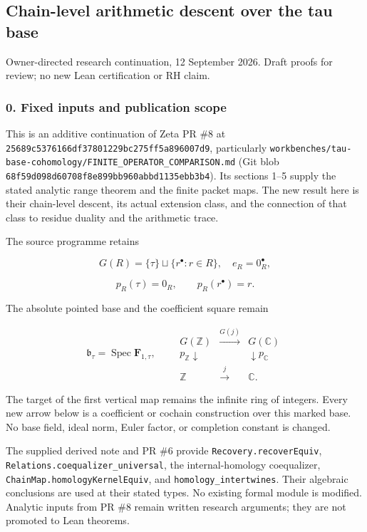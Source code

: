 \subsection{Chain-level arithmetic descent over the tau
base}\label{pr_9:chain-level-arithmetic-descent-over-the-tau-base}

Owner-directed research continuation, 12 September 2026. Draft proofs for review; no new Lean
certification or RH claim.

\subsubsection{0. Fixed inputs and publication scope}\label{pr_9:fixed-inputs-and-publication-scope}

This is an additive continuation of Zeta PR \#8 at
\nolinkurl{25689c5376166df37801229bc275ff5a896007d9}, particularly
\nolinkurl{workbenches/tau-base-cohomology/FINITE_OPERATOR_COMPARISON.md} (Git blob
\nolinkurl{68f59d098d60708f8e899bb960abbd1135ebb3b4}). Its sections 1--5 supply the stated analytic
range theorem and the finite packet maps. The new result here is their chain-level descent, its
actual extension class, and the connection of that class to residue duality and the arithmetic
trace.

The source programme retains

\[G(R)=\{\tau\}\sqcup\{r^\bullet:r\in R\},\quad e_R=0_R^\bullet,\]

\[p_R(\tau)=0_R,\qquad p_R(r^\bullet)=r.\]

The absolute pointed base and the coefficient square remain

\[\mathfrak b_\tau=\operatorname{Spec}\mathbf F_{1,\tau},\qquad
\begin{array}{ccc}G(\mathbb Z)&\xrightarrow{G(j)}&G(\mathbb C)\\
p_{\mathbb Z}\downarrow&&\downarrow p_{\mathbb C}\\
\mathbb Z&\xrightarrow{j}&\mathbb C.\end{array}\]

The target of the first vertical map remains the infinite ring of integers. Every new arrow below is
a coefficient or cochain construction over this marked base. No base field, ideal norm, Euler
factor, or completion constant is changed.

The supplied derived note and PR \#6 provide \nolinkurl{Recovery.recoverEquiv},
\nolinkurl{Relations.coequalizer_universal}, the internal-homology coequalizer,
\nolinkurl{ChainMap.homologyKernelEquiv}, and \nolinkurl{homology_intertwines}. Their algebraic
conclusions are used at their stated types. No existing formal module is modified. Analytic inputs
from PR \#8 remain written research arguments; they are not promoted to Lean theorems.

